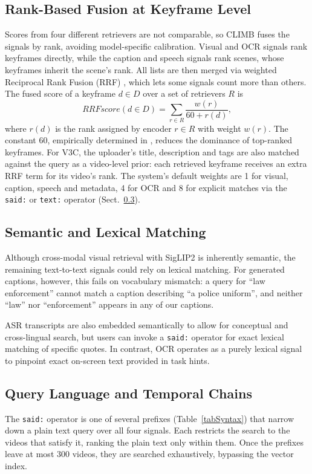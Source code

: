 \documentclass{llncs}
\newcommand{\q}[1]{\texttt{\small #1}}
\begin{document}
\subsection{Rank-Based Fusion at Keyframe Level} \label{fusion}
Scores from four different retrievers are not comparable, so CLIMB fuses the signals by rank, avoiding model-specific calibration.
Visual and OCR signals rank keyframes directly, while the caption and speech signals rank scenes, whose keyframes inherit the scene's rank.
All lists are then merged via weighted Reciprocal Rank Fusion (RRF) \cite{rrf}, which lets some signals count more than others.
The fused score of a keyframe $d \in D$ over a set of retrievers $R$ is
\begin{equation}
RRFscore(d \in D) = \sum_{r \in R}\frac{w(r)}{60 + r(d)},
\end{equation}
where $r(d)$ is the rank assigned by encoder $r \in R$ with weight $w(r)$.
The constant 60, empirically determined in \cite{rrf}, reduces the dominance of top-ranked keyframes.
For V3C, the uploader's title, description and tags are also matched against the query as a video-level prior: each retrieved keyframe receives an extra RRF term for its video's rank.
The system's default weights are 1 for visual, caption, speech and metadata, 4 for OCR and 8 for explicit matches via the \q{said:} or \q{text:} operator (Sect.~\ref{chains}).

\subsection{Semantic and Lexical Matching}
Although cross-modal visual retrieval with SigLIP2 is inherently semantic, the remaining text-to-text signals could rely on lexical matching.
For generated captions, however, this fails on vocabulary mismatch: a query for ``law enforcement'' cannot match a caption describing ``a police uniform'', 
and neither ``law'' nor ``enforcement'' appears in any of our captions.

ASR transcripts are also embedded semantically to allow for conceptual and cross-lingual search, 
but users can invoke a \q{said:} operator for exact lexical matching of specific quotes. 
In contrast, OCR operates as a purely lexical signal to pinpoint exact on-screen text provided in task hints. 

\subsection{Query Language and Temporal Chains} \label{chains}
The \q{said:} operator is one of several prefixes (Table~\ref{tabSyntax}) that narrow down a plain text query over all four signals.
Each restricts the search to the videos that satisfy it, ranking the plain text only within them. 
Once the prefixes leave at most 300 videos, they are searched exhaustively, bypassing the vector index.
\end{document}
